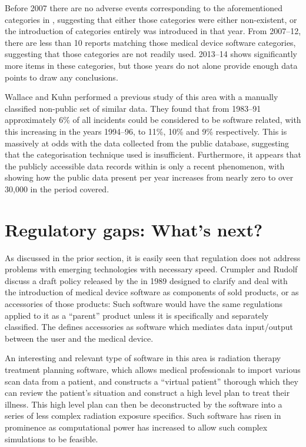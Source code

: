 \documentclass{cshonours}
\begin{document}
Before 2007 there are no adverse events corresponding to the aforementioned categories in \maude, suggesting that either those categories were either non-existent, or the introduction of categories entirely was introduced in that year. From 2007--12, there are less than 10 reports matching those medical device software categories, suggesting that those categories are not readily used. 2013--14 shows significantly more items in these categories, but those years do not alone provide enough data points to draw any conclusions.

Wallace and Kuhn \cite{wallace2001failure} performed a previous study of this area with a manually classified non-public set of similar \fda data. They found that from 1983--91 approximately 6\% of all incidents could be considered to be software related, with this increasing in the years 1994--96, to 11\%, 10\% and 9\% respectively. This is massively at odds with the data collected from the public \maude database, suggesting that the categorisation technique used is insufficient. Furthermore, it appears that the publicly accessible data records within \maude is only a recent phenomenon, with  showing how the public data present per year increases from nearly zero to over 30,000 in the period covered.


\chapter{Regulatory gaps: What's next?}
\label{chap:reggaps}
As discussed in the prior section, it is easily seen that regulation does not address problems with emerging technologies with necessary speed. Crumpler and Rudolf \cite{crumpler1997fda} discuss a draft policy released by the \fda in 1989 designed to clarify and deal with the introduction of medical device software as components of sold products, or as accessories of those products: Such software would have the same regulations applied to it as a ``parent'' product unless it is specifically and separately classified. The \fda defines accessories as software which mediates data input/output between the user and the medical device.

An interesting and relevant type of software in this area is radiation therapy treatment planning software, which allows medical professionals to import various scan data from a patient, and constructs a ``virtual patient'' thorough which they can review the patient's situation and construct a high level plan to treat their illness. This high level plan can then be deconstructed by the software into a series of less complex radiation exposure specifics. Such software has risen in prominence as computational power has increased to allow such complex simulations to be feasible.
\end{document}

